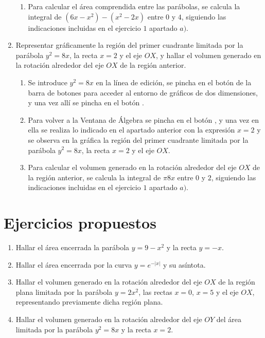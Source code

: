 \begin{enumerate}[leftmargin=*]
\begin{indicacion}
{\begin{enumerate}
\item Para calcular el área comprendida entre las parábolas, se
 calcula la integral de $(6x-x^{2})-(x^2-2x)$ entre $0$ y $4$, siguiendo
 las indicaciones incluidas en el ejercicio $1$ apartado $a)$.
\end{enumerate}
}
\end{indicacion}

\item  Representar gráficamente la región del primer cuadrante limitada
por la parábola $y^{2}=8x$, la recta $x=2$ y el eje $OX$, y hallar el volumen
generado en la rotación alrededor del eje $OX$ de la región anterior.

\begin{indicacion}
{
\begin{enumerate}
\item Se introduce $y^{2}=8x$ en la línea de edición, se pincha en el botón
  de la barra de botones para acceder al entorno de gráficos de dos dimensiones, y
una vez allí se pincha en el botón .

\item Para volver a la Ventana de Álgebra se pincha en el botón
, y una vez en ella se realiza
lo indicado en el apartado anterior con la expresión $x=2$ y se
observa en la gráfica la región del primer cuadrante limitada por la
parábola $y^{2}=8x$, la recta $x=2$ y el eje $OX$.

\item Para calcular el volumen generado en la rotación alrededor del eje $OX$ de la región anterior, se
 calcula la integral de $\pi8x$ entre $0$ y $2$, siguiendo
 las indicaciones incluidas en el ejercicio $1$ apartado $a)$.
\end{enumerate}
}
\end{indicacion}
\end{enumerate}

\section{Ejercicios propuestos}
\begin{enumerate}[leftmargin=*]
\item Hallar el área encerrada la parábola $y=9-x^{2}$ y la recta $y=-x$.
\item Hallar el área encerrada por la curva $y=e^{-|x|}$ y su asíntota.
\item Hallar el volumen generado en la rotación alrededor del eje $OX$ de la región plana limitada por la parábola $y=2x^{2}$, las rectas $x=0$, $x=5$ y el eje $OX$, representando previamente dicha región plana.
\item Hallar el volumen generado en la rotación alrededor del eje $OY$ del área limitada por la parábola $y^{2}=8x$ y la recta $x=2$.
\end{enumerate}